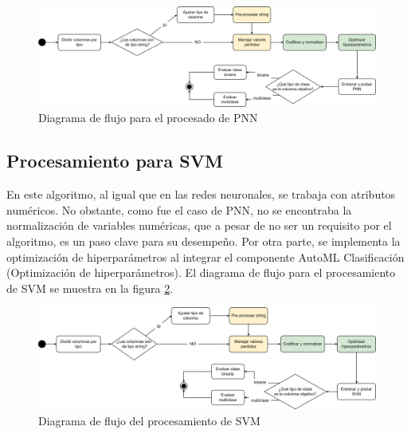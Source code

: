 \begin{figure}[H]
	\centering
	\includegraphics[width=1\linewidth]{"figuras/capi 2/modelos/procesado pnn.drawio"}
	\caption{Diagrama de flujo para el procesado de PNN}
	\label{fig:procesado-pnn}
\end{figure}


\subsection{Procesamiento para SVM}
En este algoritmo, al igual que en las redes neuronales, se trabaja con atributos numéricos. No obstante, como fue el caso de PNN, no se encontraba la normalización de variables numéricas, que a pesar de no ser un requisito por el algoritmo, es un paso clave para su desempeño. Por otra parte, se implementa la optimización de hiperparámetros al integrar el componente AutoML Clasificación (Optimización de hiperparámetros). El diagrama de flujo para el procesamiento de SVM se muestra en la figura \ref{fig:procesado-svm}.

\begin{figure}[H]
	\centering
	\includegraphics[width=1\linewidth]{"figuras/capi 2/modelos/procesado svm.drawio"}
	\caption{Diagrama de flujo del procesamiento de SVM}
	\label{fig:procesado-svm}
\end{figure}




